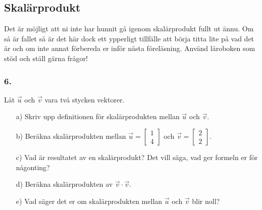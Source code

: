 \documentclass{article}
\begin{document}
\subsection*{Skalärprodukt}
\noindent
Det är möjligt att ni inte har hunnit gå igenom skalärprodukt fullt ut ännu. Om så är fallet så är det här dock ett ypperligt tillfälle att börja titta lite på vad det är och om inte annat förbereda er inför nästa föreläsning. Använd läroboken som stöd och ställ gärna frågor!

\subsubsection*{6.}
Låt $\vec{u}$ och $\vec{v}$ vara två stycken vektorer.
\begin{itemize}
\item[a) ] Skriv upp definitionen för skalärprodukten mellan $\vec{u}$ och $\vec{v}$.
\item[b) ] Beräkna skalärprodukten mellan $\vec{u} = \begin{bmatrix} 1 \\ 4 \end{bmatrix}$ och $\vec{v} = \begin{bmatrix} 2 \\ 2 \end{bmatrix}.$
\item[c) ] Vad är resultatet av en skalärprodukt? Det vill säga, vad ger formeln er för någonting?
\item[d) ] Beräkna skalärprodukten av $\vec{v} \cdot \vec{v}$.
\item[e) ] Vad säger det er om skalärprodukten mellan $\vec{u}$ och $\vec{v}$ blir noll?
\end{itemize}
\end{document}
